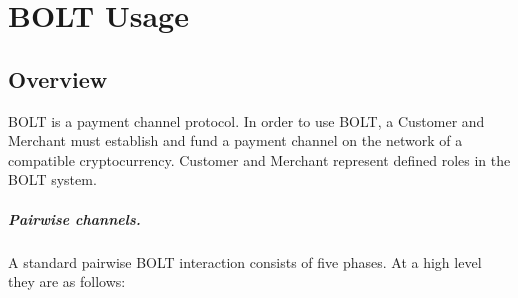 \documentclass[11pt]{report}
\begin{document}
\chapter{BOLT Usage}
\label{ch:usage}

\section{Overview}

BOLT is a payment channel protocol. In order to use BOLT, a Customer and Merchant must establish and fund a payment channel on the network of a compatible cryptocurrency. Customer and Merchant represent defined roles in the BOLT system.

\paragraph{Pairwise channels.} A standard pairwise BOLT interaction consists of five phases. At a high level they are as follows:
\end{document}
